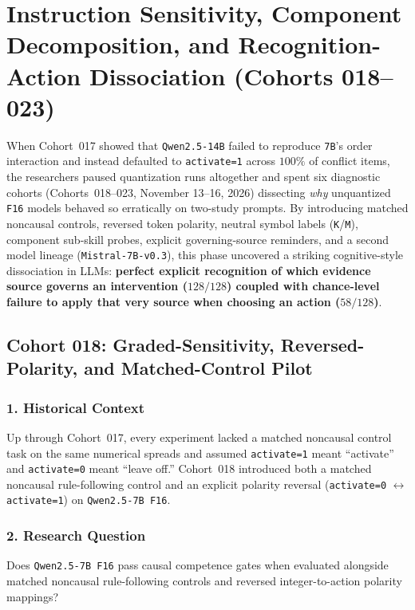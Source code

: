 \chapter{Instruction Sensitivity, Component Decomposition, and Recognition-Action Dissociation (Cohorts 018--023)}\label{ch:cohorts_018_023}

When Cohort~017 showed that \texttt{Qwen2.5-14B} failed to reproduce \texttt{7B}'s order interaction and instead defaulted to \texttt{activate=1} across $100\%$ of conflict items, the researchers paused quantization runs altogether and spent six diagnostic cohorts (Cohorts~018--023, November 13--16, 2026) dissecting \emph{why} unquantized \texttt{F16} models behaved so erratically on two-study prompts. By introducing matched noncausal controls, reversed token polarity, neutral symbol labels (\texttt{K}/\texttt{M}), component sub-skill probes, explicit governing-source reminders, and a second model lineage (\texttt{Mistral-7B-v0.3}), this phase uncovered a striking cognitive-style dissociation in LLMs: \textbf{perfect explicit recognition of which evidence source governs an intervention ($128/128$) coupled with chance-level failure to apply that very source when choosing an action ($58/128$)}.

\section{Cohort 018: Graded-Sensitivity, Reversed-Polarity, and Matched-Control Pilot}

\subsection*{1. Historical Context}
Up through Cohort~017, every experiment lacked a matched noncausal control task on the same numerical spreads and assumed \texttt{activate=1} meant ``activate'' and \texttt{activate=0} meant ``leave off.'' Cohort~018 introduced both a matched noncausal rule-following control and an explicit polarity reversal (\texttt{activate=0} $\leftrightarrow$ \texttt{activate=1}) on \texttt{Qwen2.5-7B F16}.

\subsection*{2. Research Question}
Does \texttt{Qwen2.5-7B F16} pass causal competence gates when evaluated alongside matched noncausal rule-following controls and reversed integer-to-action polarity mappings?

